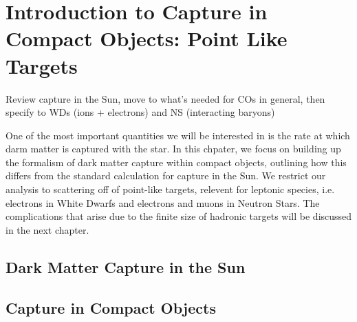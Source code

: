 \graphicspath{{img/chapter_2/}}

\chapter{Introduction to Capture in Compact Objects: Point Like Targets}
\label{chapter:capture_1}

\begin{synopsis}
  Review capture in the Sun, move to what's needed for COs in general, then specify to WDs (ions + electrons) and NS (interacting baryons)
\end{synopsis}

  One of the most important quantities we will be interested in is the 
  rate at which darm matter is captured with the star. 
  In this chpater, we focus on building up the formalism of dark matter 
  capture within compact objects, outlining how this differs from the 
  standard calculation for capture in the Sun. We restrict our analysis to 
  scattering off of point-like targets, relevent for leptonic species, 
  i.e. electrons in White Dwarfs and electrons and muons in Neutron Stars.
  The complications that arise due to the finite size of hadronic targets 
  will be discussed in the next chapter.
  


\section{Dark Matter Capture in the Sun}



\section{Capture in Compact Objects}

